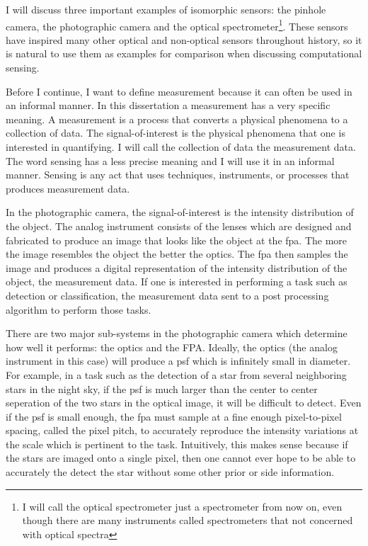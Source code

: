 I will discuss three important examples of isomorphic sensors: the pinhole camera, the photographic camera and the optical spectrometer\footnote{I will call the optical spectrometer just a spectrometer from now on, even though there are many instruments called spectrometers that not concerned with optical spectra}. These sensors have inspired many other optical and non-optical sensors throughout history, so it is natural to use them as examples for comparison when discussing computational sensing. 

Before I continue, I want to define \gls{measurement} because it can often be used in an informal manner. In this dissertation a \gls{measurement} has a very specific meaning. A \gls{measurement} is a process that converts a physical phenomena to a collection of data. The signal-of-interest is the physical phenomena that one is interested in quantifying. I will call the collection of data the measurement data.  The word sensing has a less precise meaning and I will use it in an informal manner. Sensing is any act that uses techniques, instruments, or processes that produces measurement data. 

In the photographic camera, the signal-of-interest is the intensity distribution of the object. The analog instrument consists of the lenses which are designed and fabricated to produce an image that looks like the object at the \gls{fpa}. The more the image resembles the object the better the optics. The \gls{fpa} then samples the image and produces a digital representation of the intensity distribution of the object, the measurement data. If one is interested in performing a task such as detection or classification, the measurement data sent to a post processing algorithm to perform those tasks. 

There are two major sub-systems in the photographic camera which determine how well it performs: the optics and the FPA. Ideally, the optics (the analog instrument in this case) will produce a \gls{psf} which is infinitely small in diameter. For example, in a task such as the detection of a star from several neighboring stars in the night sky, if the \gls{psf} is much larger than the center to center seperation of the two stars in the optical image, it will be difficult to detect. Even if the \gls{psf} is small enough, the \gls{fpa} must sample at a fine enough pixel-to-pixel spacing, called the \gls{pixel pitch}, to accurately reproduce the intensity variations at the scale which is pertinent to the task. Intuitively, this makes sense because if the stars are imaged onto a single pixel, then one cannot ever hope to be able to accurately the detect the star without some other prior or side information. 

